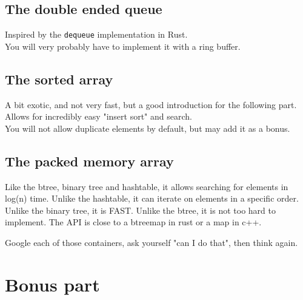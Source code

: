 \documentclass{42-en}
\begin{document}
    \section{The double ended queue}
    Inspired by the \texttt{dequeue} implementation in Rust.\\
    You will very probably have to implement it with a ring buffer.

    \section{The sorted array}
    A bit exotic, and not very fast, but a good introduction for the following part.
    Allows for incredibly easy "insert sort" and search.\\
    You will not allow duplicate elements by default, but may add it as a bonus.

    \section{The packed memory array}
    Like the btree, binary tree and hashtable, it allows searching
    for elements in log(n) time. Unlike the hashtable, it can iterate on elements in
    a specific order. Unlike the binary tree, it is FAST. Unlike the btree,
    it is not too hard to implement. The API is close to a btreemap in rust or a map in c++.

    Google each of those containers, ask yourself "can I do that", then think again.




\chapter{Bonus part}
\end{document}
